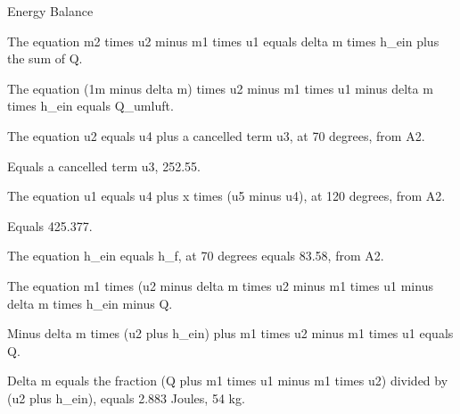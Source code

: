 Energy Balance

The equation m2 times u2 minus m1 times u1 equals delta m times h_ein plus the sum of Q.

The equation (1m minus delta m) times u2 minus m1 times u1 minus delta m times h_ein equals Q_umluft.

The equation u2 equals u4 plus a cancelled term u3, at 70 degrees, from A2.

Equals a cancelled term u3, 252.55.

The equation u1 equals u4 plus x times (u5 minus u4), at 120 degrees, from A2.

Equals 425.377.

The equation h_ein equals h_f, at 70 degrees equals 83.58, from A2.

The equation m1 times (u2 minus delta m times u2 minus m1 times u1 minus delta m times h_ein minus Q.

Minus delta m times (u2 plus h_ein) plus m1 times u2 minus m1 times u1 equals Q.

Delta m equals the fraction (Q plus m1 times u1 minus m1 times u2) divided by (u2 plus h_ein), equals 2.883 Joules, 54 kg.